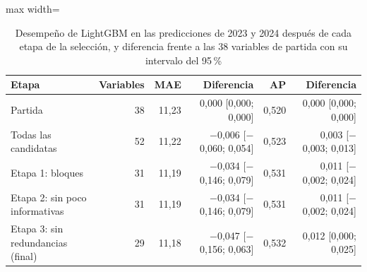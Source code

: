 \begin{table}[htbp]\centering\small
\caption{Desempeño de LightGBM en las predicciones de 2023 y 2024 después de cada etapa de la selección, y diferencia frente a las 38 variables de partida con su intervalo del 95\,\%}\label{tab:pasos}
\begin{adjustbox}{max width=\textwidth}\begin{tabular}{lrrrrr}\toprule
Etapa & Variables & MAE & Diferencia & AP & Diferencia\\ \midrule
Partida & 38 & 11{,}23 & 0{,}000 [0{,}000; 0{,}000] & 0{,}520 & 0{,}000 [0{,}000; 0{,}000] \\
Todas las candidatas & 52 & 11{,}22 & \ensuremath{-}0{,}006 [\ensuremath{-}0{,}060; 0{,}054] & 0{,}523 & 0{,}003 [\ensuremath{-}0{,}003; 0{,}013] \\
Etapa 1: bloques & 31 & 11{,}19 & \ensuremath{-}0{,}034 [\ensuremath{-}0{,}146; 0{,}079] & 0{,}531 & 0{,}011 [\ensuremath{-}0{,}002; 0{,}024] \\
Etapa 2: sin poco informativas & 31 & 11{,}19 & \ensuremath{-}0{,}034 [\ensuremath{-}0{,}146; 0{,}079] & 0{,}531 & 0{,}011 [\ensuremath{-}0{,}002; 0{,}024] \\
Etapa 3: sin redundancias (final) & 29 & 11{,}18 & \ensuremath{-}0{,}047 [\ensuremath{-}0{,}156; 0{,}063] & 0{,}532 & 0{,}012 [0{,}000; 0{,}025] \\
\bottomrule\end{tabular}\end{adjustbox}\end{table}
